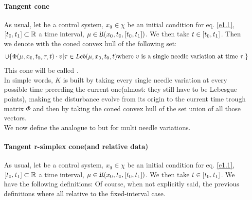 \paragraph{Tangent cone} As usual, let \controlSystem\space be a control system, $x_0\in\chi$ be an initial condition for eq. \eqref{e1.1}, $[t_0,t_1]\subset\mathbb{R}$ a time interval, $\mu\in\mathfrak{U}(x_0,t_0,[t_0,t_1])$. We then take $t\in[t_0,t_1]$. Then we denote with  the coned convex hull of the following set: 
\[ \cup \{ \Phi(\mu,x_0,t_0,\tau,t)\cdot v|\tau\in Leb(\mu,x_0,t_0,t)\text{where $v$ is a single needle variation at time }\tau. \} \]
This cone will be called .\\
In simple words, $K$ is built by taking every single needle variation at every possible time preceding the current one(almost: they still have to be Lebesgue points), making the disturbance evolve from its origin to the current time trough matrix $\Phi$ and then by taking the coned convex hull of the set union of all those vectors. \\
We now define the analogue to  but for multi needle variations.

\paragraph{Tangent r-simplex cone(and relative data)} As usual, let \controlSystem\space be a control system, $x_0\in\chi$ be an initial condition for eq. \eqref{e1.1}, $[t_0,t_1]\subset\mathbb{R}$ a time interval, $\mu\in\mathfrak{U}(x_0,t_0,[t_0,t_1])$. We then take $t\in[t_0,t_1]$. We have the following definitions: 
Of course, when not explicitly said, the previous definitions where all relative to the fixed-interval case.

